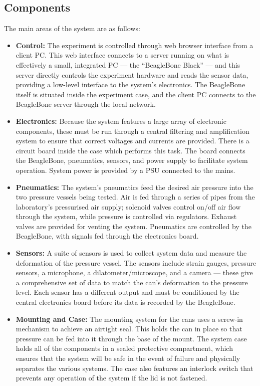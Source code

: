 \subsection{Components}

The main areas of the system are as follows:

\begin{itemize}
	\item {\bf Control:} The experiment is controlled through web browser interface from a client PC. This web interface connects to a server running on what is effectively a small, integrated PC --- the ``BeagleBone Black'' --- and this server directly controls the experiment hardware and reads the sensor data, providing a low-level interface to the system's electronics. The BeagleBone itself is situated inside the experiment case, and the client PC connects to the BeagleBone server through the local network.
	\item {\bf Electronics:} Because the system features a large array of electronic components, these must be run through a central filtering and amplification system to ensure that correct voltages and currents are provided. There is a circuit board inside the case which performs this task. The board connects the BeagleBone, pneumatics, sensors, and power supply to facilitate system operation. System power is provided by a PSU connected to the mains.
	\item {\bf Pneumatics:} The system's pneumatics feed the desired air pressure into the two pressure vessels being tested. Air is fed through a series of pipes from the laboratory's pressurised air supply; solenoid valves control on/off air flow through the system, while pressure is controlled via regulators. Exhaust valves are provided for venting the system. Pneumatics are controlled by the BeagleBone, with signals fed through the electronics board.
	\item {\bf Sensors:} A suite of sensors is used to collect system data and measure the deformation of the pressure vessel. The sensors include strain gauges, pressure sensors, a microphone, a dilatometer/microscope, and a camera --- these give a comprehensive set of data to match the can's deformation to the pressure level. Each sensor has a different output and must be conditioned by the central electronics board before its data is recorded by the BeagleBone.

	\item {\bf Mounting and Case:} The mounting system for the cans uses a screw-in mechanism to achieve an airtight seal. This holds the can in place so that pressure can be fed into it through the base of the mount. The system case holds all of the components in a sealed protective compartment, which ensures that the system will be safe in the event of failure and physically separates the various systems. The case also features an interlock switch that prevents any operation of the system if the lid is not fastened.

\end{itemize}

